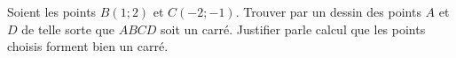 
\begin{exercice}\label{exosmath-0486}

    Soient les points \( B(1;2)\) et \( C(-2;-1)\). Trouver par un dessin des points \( A\) et \( D\) de telle sorte que \( ABCD\) soit un carré. Justifier parle calcul que les points choisis forment bien un carré.

\end{exercice}
